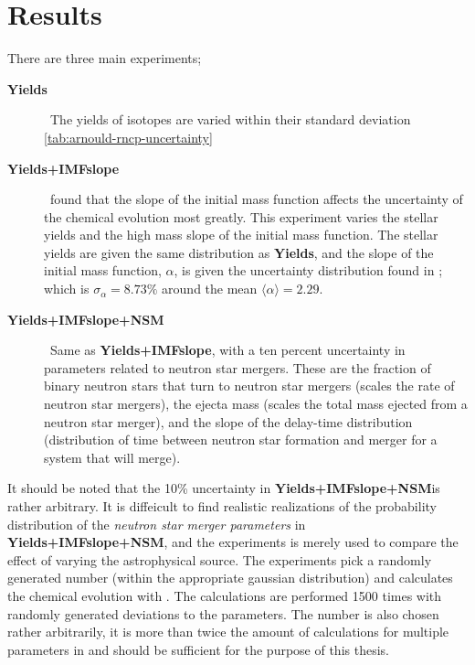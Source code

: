 \chapter{Results}
\label{sec:results}

\newcommand\expone{\textbf{Yields}}
\newcommand\exptwo{\textbf{Yields+IMFslope}}
\newcommand\expthree{\textbf{Yields+IMFslope+NSM}}
There are three main experiments;
\begin{description}
\item[\expone] \, The yields of isotopes are varied within their standard deviation \ref{tab:arnould-rncp-uncertainty}
\item[\exptwo] \,  found that the slope of the initial mass function affects the uncertainty of the chemical evolution most greatly. This experiment varies the stellar yields and the high mass slope of the initial mass function. The stellar yields are given the same distribution as \expone, and the slope of the initial mass function, $\alpha$, is given the uncertainty distribution found in ; which is $\sigma_{\alpha}=8.73\%$ around the mean $\langle \alpha \rangle = 2.29$.
\item[\expthree] \, Same as \exptwo, with a ten percent uncertainty in parameters related to neutron star mergers. These are the fraction of binary neutron stars that turn to neutron star mergers (scales the rate of neutron star mergers), the ejecta mass (scales the total mass ejected from a neutron star merger), and the slope of the delay-time distribution (distribution of time between neutron star formation and merger for a system that will merge).
\end{description}
It should be noted that the 10\% uncertainty in \expthree is rather arbitrary.
It is diffeicult to find realistic realizations of the probability distribution of the \textit{neutron star merger parameters} in \expthree, and the experiments is merely used to compare the effect of varying the astrophysical source.
The experiments pick a randomly generated number (within the appropriate gaussian distribution) and calculates the chemical evolution with \omegamodel.
The calculations are performed 1500 times with randomly generated deviations to the parameters.
The number is also chosen rather arbitrarily, it is more than twice the amount of calculations for multiple parameters in  and should be sufficient for the purpose of this thesis.


